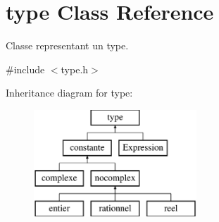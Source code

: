 \hypertarget{classtype}{\section{type Class Reference}
\label{classtype}
}


Classe representant un type.  




{\ttfamily \#include $<$type.\-h$>$}

Inheritance diagram for type\-:\begin{figure}[H]
\begin{center}
\leavevmode
\includegraphics[height=4.000000cm]{classtype}
\end{center}
\end{figure}
